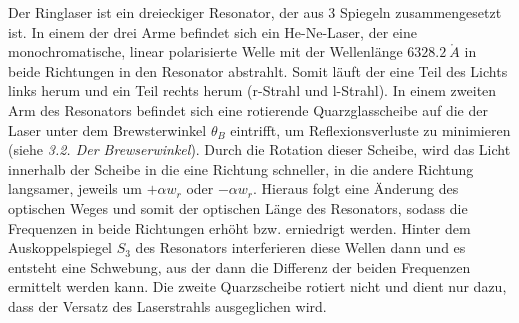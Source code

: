 Der Ringlaser ist ein dreieckiger Resonator, der aus 3 Spiegeln zusammengesetzt ist. In einem der drei Arme befindet sich ein He-Ne-Laser, der eine monochromatische, linear polarisierte Welle mit der Wellenlänge $6328.2 \ \mathring A$ in beide Richtungen in den Resonator abstrahlt. Somit läuft der eine Teil des Lichts links herum und ein Teil rechts herum (r-Strahl und l-Strahl). In einem zweiten Arm des Resonators befindet sich eine rotierende Quarzglasscheibe auf die der Laser unter dem Brewsterwinkel $\theta_B$ eintrifft, um Reflexionsverluste zu minimieren (siehe \emph{3.2. Der Brewserwinkel}). Durch die Rotation dieser Scheibe, wird das Licht innerhalb der Scheibe in die eine Richtung schneller, in die andere Richtung langsamer, jeweils um $+\alpha w_r$ oder $-\alpha w_r$. Hieraus folgt eine Änderung des optischen Weges und somit der optischen Länge des Resonators, sodass die Frequenzen in beide Richtungen erhöht bzw. erniedrigt werden. Hinter dem Auskoppelspiegel $S_3$ des Resonators interferieren diese Wellen dann und es entsteht eine Schwebung, aus der dann die Differenz der beiden Frequenzen ermittelt werden kann. Die zweite Quarzscheibe rotiert nicht und dient nur dazu, dass der Versatz des Laserstrahls ausgeglichen wird.